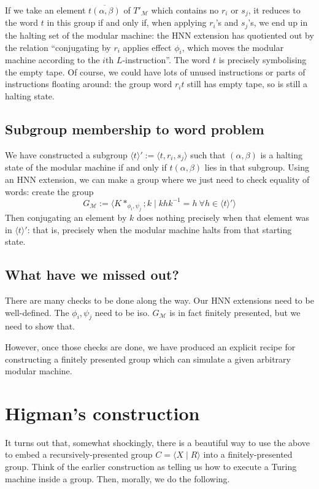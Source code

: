\documentclass[11pt]{amsart}
\theoremstyle{remark}
\begin{document}
If we take an element $\overline{t(\alpha, \beta)}$ of $T'_{\mathcal{M}}$ which contains no $r_i$ or $s_j$, it reduces to the word $t$ in this group if and only if, when applying $r_i$'s and $s_j$'s, we end up in the halting set of the modular machine:
the HNN extension has quotiented out by the relation ``conjugating by $r_i$ applies effect $\phi_i$, which moves the modular machine according to the $i$th $L$-instruction''.
The word $t$ is precisely symbolising the empty tape.
Of course, we could have lots of unused instructions or parts of instructions floating around: the group word $r_i t$ still has empty tape, so is still a halting state.

\subsection{Subgroup membership to word problem}
We have constructed a subgroup $\langle t \rangle' := \langle t, r_i, s_j \rangle$ such that $(\alpha, \beta)$ is a halting state of the modular machine if and only if $t(\alpha, \beta)$ lies in that subgroup.
Using an HNN extension, we can make a group where we just need to check equality of words:
create the group $$G_{\mathcal{M}} := \langle K*_{\phi_i, \psi_j}; k \mid khk^{-1} = h \ \forall h \in \langle t \rangle' \rangle$$
Then conjugating an element by $k$ does nothing precisely when that element was in $\langle t \rangle'$: that is, precisely when the modular machine halts from that starting state.

\subsection{What have we missed out?}
There are many checks to be done along the way.
Our HNN extensions need to be well-defined.
The $\phi_i, \psi_j$ need to be iso.
$G_{\mathcal{M}}$ is in fact finitely presented, but we need to show that.

However, once those checks are done, we have produced an explicit recipe for constructing a finitely presented group which can simulate a given arbitrary modular machine.

\section{Higman's construction}

It turns out that, somewhat shockingly, there is a beautiful way to use the above to embed a recursively-presented group $C = \langle X \mid R \rangle$ into a finitely-presented group.
Think of the earlier construction as telling us how to execute a Turing machine inside a group.
Then, morally, we do the following.
\end{document}
